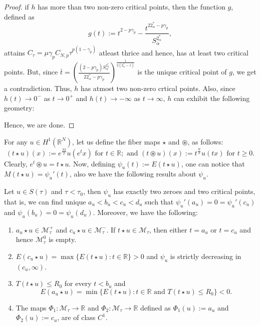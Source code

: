\documentclass[11pt]{article}
\numberwithin{equation}{section}
\numberwithin{mytheorem}{section}
\begin{document}
\begin{proof}
			if $h$ has more than two non-zero critical points, then the function $g$, defined as
			$$g(t):=t^{2-p\gamma_p}-\frac{t^{22^*_{\alpha}-p\gamma_p}}{S_{\alpha}^{2^*_{\alpha}}},$$
			attains $C_{\tau}=\mu \gamma_pC_{N,p}\tau^{p(1-\gamma_p)}$ atleast thrice and hence, has at least two critical points. But, since $\bar{t}=\left(\frac{(2-p\gamma_p)S_{\alpha}^{2^*_{\alpha}}}{22^*_{\alpha}-p\gamma_p}\right)^{\frac{1}{2(2^*_{\alpha}-1)}}$ is the unique critical point of $g$, we get a contradiction. Thus, $h$ has atmost two non-zero crtical points. Also, since $h(t)\rightarrow 0^-$ as $t\rightarrow 0^+$ and $h(t)\rightarrow -\infty$ as $t\rightarrow \infty$, $h$ can exhibit the following geometry:
			\begin{center}
			\end{center}
			Hence, we are done.
		\end{proof}
		\noindent For any $u\in H^1(\mathbb{R}^N)$, let us define the fiber maps $\star$ and $\circledast$, as follows:
		$$(t\star u)(x):=e^{\frac{Nt}{2}}u(e^tx)\text{ for } t\in \mathbb{R}; \text{ and } (t\circledast u)(x):=t^{\frac{N}{2}}u(tx) \text{ for } t\geq 0.$$
		Clearly, $e^t\circledast u= t\star u$. Now, defining $\psi_{u}(t):=E(t\star u)$, one can notice that $M(t\star u )=\psi_{u}'(t)$, also we have the following results about $\psi_{u}$.
		\begin{lemma}\label{Lemma 2.3}
			Let $u\in S(\tau)$ and $\tau <\tau_0$, then $\psi_{u}$ has exactly two zeroes and two critical points, that is, we can find unique $a_u<b_u<c_u<d_u$ such that $\psi_{u}'(a_u)=0=\psi_{u}'(c_u)$ and $\psi_{u}(b_u)=0=\psi_{u}(d_u)$. Moreover, we have the following:
			\begin{enumerate}
				\item $a_u\star u \in \mathcal{M}_{\tau}^+$ and $c_u\star u\in \mathcal{M}_{\tau}^-$. If $t\star u \in \mathcal{M}_{\tau}$, then either $t=a_u$ or $t=c_u$ and hence $\mathcal{M}_{\tau}^0$ is empty.
				\item $E(c_u\star u)=\max\{E(t\star u): t\in \mathbb{R}\}>0$ and $\psi_{u}$ is strictly decreasing in $(c_u,\infty)$.
				\item $T(t\star u)\leq R_0$ for every $t<b_u$ and $$E(a_u \star u)=\min\{E(t\star u): t\in \mathbb{R} \text{ and } T(t\star u)\leq R_0\}<0.$$
				\item The maps $\Phi_1:\mathcal{M}_{\tau}\rightarrow \mathbb{R}$ and $\Phi_2:\mathcal{M}_{\tau}\rightarrow \mathbb{R}$ defined as $\Phi_1(u):=a_u$ and $\Phi_2(u):=c_u$, are of class $C^1$.
			\end{enumerate}
		\end{lemma}
\end{document}

